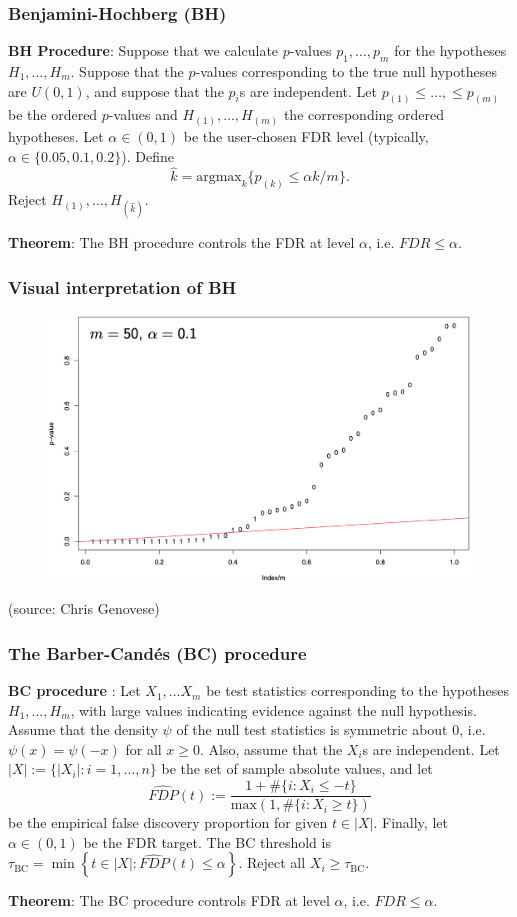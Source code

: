 \documentclass{beamer}
\begin{document}
\begin{frame}
\frametitle{Benjamini-Hochberg (BH)}
\textbf{BH Procedure}: Suppose that we calculate $p$-values $p_1, \dots, p_m$ for the hypotheses $H_1, \dots, H_m$. Suppose that the $p$-values corresponding to the true null hypotheses are $U(0,1)$, and suppose that the $p_i$s are independent. Let $p_{(1)} \leq \dots, \leq p_{(m)}$ be the ordered $p$-values and $H_{(1)}, \dots, H_{(m)}$ the corresponding ordered hypotheses. Let $\alpha \in (0,1)$ be the user-chosen FDR level (typically, $\alpha \in \{ 0.05, 0.1, 0.2\}$). Define
$$\hat{k} = \textrm{argmax}_{k} \{ p_{(k)} \leq \alpha k /m \}.$$
Reject $H_{(1)}, \dots, H_{(\hat{k})}$.

\textbf{Theorem}: The BH procedure controls the FDR at level $\alpha$, i.e. $FDR \leq \alpha.$

\end{frame}

\begin{frame}
\frametitle{Visual interpretation of BH}

\begin{figure}
	\centering
	\includegraphics[width=1\linewidth]{bh_fig}
	\label{bhfig}
\end{figure}
(source: Chris Genovese)
\end{frame}

\begin{frame}
\frametitle{The Barber-Cand\'es (BC) procedure}
\textbf{BC procedure}  \parencite{Barber2015} : Let $X_1, \dots X_m$ be test statistics corresponding to the hypotheses $H_1, \dots, H_m$, with large values indicating evidence against the null hypothesis. Assume that the density $\psi$ of the null test statistics is symmetric about $0$, i.e. $\psi( x ) = \psi( -x )$ for all $x \geq 0$. Also, assume that the $X_i$s are independent. Let $|X| := \{ |X_i| : i = 1, \dots, n \}$ be the set of sample absolute values, and let $$\widehat{FDP}(t) := \frac{ 1 + \# \{ i:X_i \leq -t \} }{ \textrm{max} \left( 1, \# \{ i  : X_i \geq t \} \right) }$$ be the empirical false discovery proportion for given $t \in |X|.$ Finally, let $\alpha \in (0,1)$ be the FDR target. The BC threshold is $\tau_{\textrm{BC}} = \min \left\{ t \in |X| : \widehat{FDP}(t) \leq \alpha \right\}.$ Reject all $X_i \geq \tau_{\textrm{BC}}$.

\textbf{Theorem}: The BC procedure controls FDR at level $\alpha$, i.e. $FDR \leq \alpha$.
\end{frame}
\end{document}
